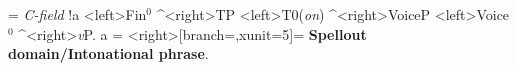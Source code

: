 \begin{exe}
	\ex 
	\jtree[scaleby=1.5, labelgap=0]
	\! = {\textit{C-field}} !a
	<left>{Fin$^{0}$} ^<right>{TP}
	<left>{T${0}$}({\textit{on}}) ^<right>{VoiceP}
	<left>{Voice$^{0}$} ^<right>{\textit{v}P}.
	\!a = <right>[branch=\blank,xunit=5]{= \textbf{ Spellout domain/Intonational phrase}}.
	\endjtree
\end{exe}
